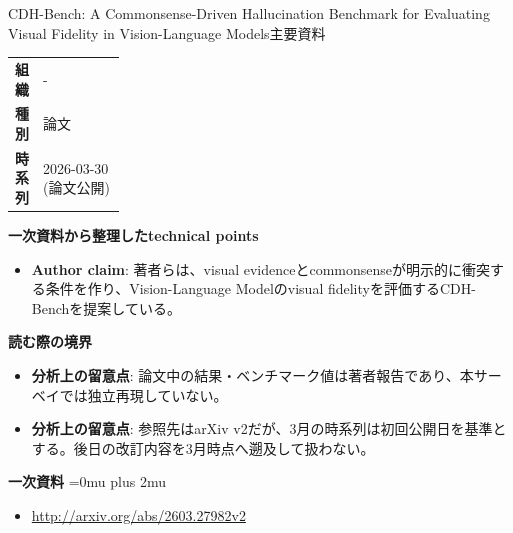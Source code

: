 \begin{technicalnote}{CDH-Bench: A Commonsense-Driven Hallucination Benchmark for Evaluating Visual Fidelity in Vision-Language Models}{主要資料}
\begingroup
\begin{tabularx}{\linewidth}{@{}>{\bfseries}p{0.22\linewidth}X@{}}
組織 & - \\
種別 & 論文 \\
時系列 & 2026-03-30 (論文公開) \\
\end{tabularx}
\smallskip
{\bfseries 一次資料から整理したtechnical points}
\begin{itemize}[leftmargin=1.5em,itemsep=0.35em]
\item \textbf{Author claim}: 著者らは、visual evidenceとcommonsenseが明示的に衝突する条件を作り、Vision-Language Modelのvisual fidelityを評価するCDH-Benchを提案している。
\end{itemize}
\begin{minipage}{\linewidth}
{\bfseries 読む際の境界}
\begin{itemize}[leftmargin=1.5em,itemsep=0.35em]
\item \textbf{分析上の留意点}: 論文中の結果・ベンチマーク値は著者報告であり、本サーベイでは独立再現していない。
\item \textbf{分析上の留意点}: 参照先はarXiv v2だが、3月の時系列は初回公開日を基準とする。後日の改訂内容を3月時点へ遡及して扱わない。
\end{itemize}
\begin{samepage}
{\bfseries 一次資料}
\begingroup\sloppy
\Urlmuskip=0mu plus 2mu\relax
\begin{itemize}[leftmargin=1.5em,itemsep=0.25em]
\item {\scriptsize\url{http://arxiv.org/abs/2603.27982v2}}
\end{itemize}
\endgroup
\end{samepage}
\end{minipage}
\endgroup
\end{technicalnote}
\medskip

